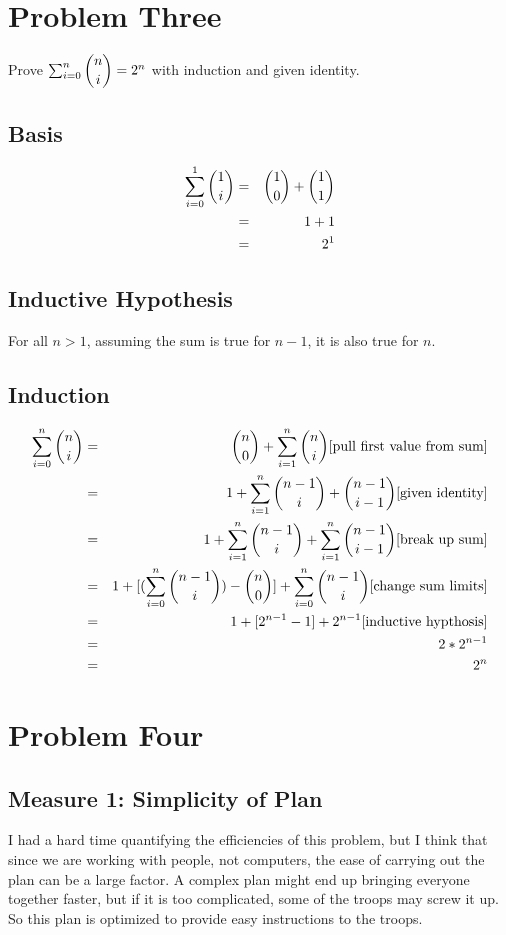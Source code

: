 \documentclass[a4paper,12pt]{article}
\begin{document}
\section{Problem Three}
Prove \(\sum_{i=0}^{n} \dbinom{n}{i} = 2^n\) with induction and given identity.
\subsection{Basis}
\begin{eqnarray*}
  \sum_{i=0}^{1} \dbinom{1}{i} &=& \dbinom{1}{0} + \dbinom{1}{1} \\
  &=& 1 + 1 \\
  &=& 2^1 \\
\end{eqnarray*}
\subsection{Inductive Hypothesis}
For all \(n > 1\), assuming the sum is true for \(n-1\), it is also true for \(n\).
\subsection{Induction}
\begin{eqnarray*}
  \sum_{i=0}^{n} \dbinom{n}{i} &=& \dbinom{n}{0} + \sum_{i=1}^{n} \dbinom{n}{i} \text{[pull first value from sum]} \\
  &=& 1 + \sum_{i=1}^{n} \dbinom{n-1}{i} + \dbinom{n-1}{i-1} \text{[given identity]} \\
  &=& 1 + \sum_{i=1}^{n} \dbinom{n-1}{i} + \sum_{i=1}^{n} \dbinom{n-1}{i-1} \text{[break up sum]} \\
  &=& 1 + [(\sum_{i=0}^{n} \dbinom{n-1}{i}) - \dbinom{n}{0}] + \sum_{i=0}^{n} \dbinom{n-1}{i} \text{[change sum limits]} \\
  &=& 1 + [2^{n-1} - 1] + 2^{n-1} \text{[inductive hypthosis]} \\
  &=& 2*2^{n-1} \\
  &=& 2^n
\end{eqnarray*}
\section{Problem Four}
\subsection{Measure 1: Simplicity of Plan}
I had a hard time quantifying the efficiencies of this problem, but I think that since we are working
with people, not computers, the ease of carrying out the plan can be a large factor. A complex plan might
end up bringing everyone together faster, but if it is too complicated, some of the troops may screw it
up. So this plan is optimized to provide easy instructions to the troops. \\
\end{document}

